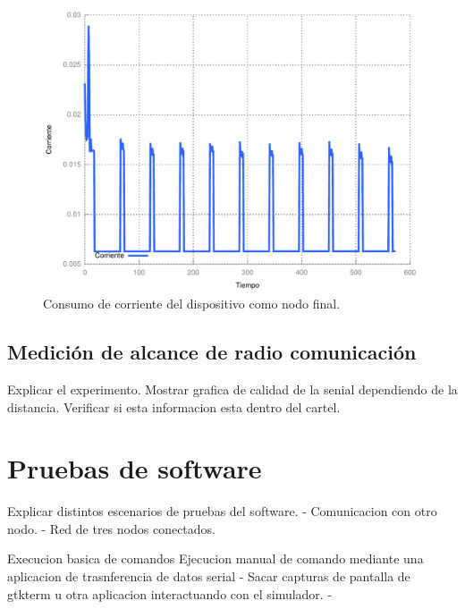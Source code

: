 \begin{figure}
	\centering
	\includegraphics[scale=0.5]{capitulo_4_imgs/corriente_sd_enddevice.pdf}
	\caption{Consumo de corriente del dispositivo como nodo final.}
	\label{fig:consumo_enddevice}
\end{figure}



\subsection{Medici\'on de alcance de radio comunicaci\'on}

Explicar el experimento. 
Mostrar grafica de calidad de la senial dependiendo de la distancia. 
Verificar si esta informacion esta dentro del cartel. 


\section{Pruebas de software}

Explicar distintos escenarios de pruebas del software. 
- Comunicacion con otro nodo. 
- Red de tres nodos conectados.

Execucion basica de comandos 
Ejecucion manual de comando mediante una aplicacion de trasnferencia de datos serial
- Sacar capturas de pantalla de gtkterm u otra aplicacion interactuando con el simulador. 
- 

